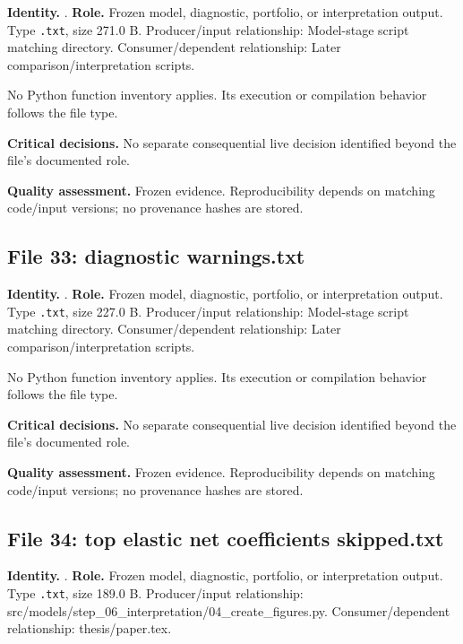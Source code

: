 \documentclass[
  11pt,
  a4paper]{article}
\begin{document}
\textbf{Identity.}
.
\textbf{Role.} Frozen model, diagnostic, portfolio, or interpretation
output. Type \texttt{.txt}, size 271.0 B. Producer/input relationship:
Model-stage script matching directory. Consumer/dependent relationship:
Later comparison/interpretation scripts.

No Python function inventory applies. Its execution or compilation
behavior follows the file type.

\textbf{Critical decisions.} No separate consequential live decision
identified beyond the file's documented role.

\textbf{Quality assessment.} Frozen evidence. Reproducibility depends on
matching code/input versions; no provenance hashes are stored.

\subsection{File 33: diagnostic
warnings.txt}\label{file-278227073251792648}

\textbf{Identity.}
.
\textbf{Role.} Frozen model, diagnostic, portfolio, or interpretation
output. Type \texttt{.txt}, size 227.0 B. Producer/input relationship:
Model-stage script matching directory. Consumer/dependent relationship:
Later comparison/interpretation scripts.

No Python function inventory applies. Its execution or compilation
behavior follows the file type.

\textbf{Critical decisions.} No separate consequential live decision
identified beyond the file's documented role.

\textbf{Quality assessment.} Frozen evidence. Reproducibility depends on
matching code/input versions; no provenance hashes are stored.

\subsection{File 34: top elastic net coefficients
skipped.txt}\label{file-4871789799833788594}

\textbf{Identity.}
.
\textbf{Role.} Frozen model, diagnostic, portfolio, or interpretation
output. Type \texttt{.txt}, size 189.0 B. Producer/input relationship:
src/models/step\_\allowbreak{}06\_\allowbreak{}interpretation/04\_\allowbreak{}create\_\allowbreak{}figures.py.
Consumer/dependent relationship: thesis/paper.tex.
\end{document}

